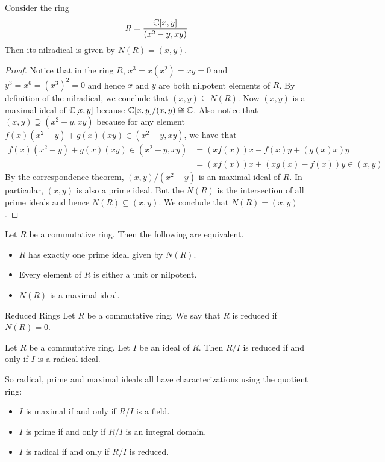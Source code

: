 \documentclass[a4paper]{article}
\begin{document}
\begin{eg}{}{} Consider the ring $$R=\frac{\mathbb{C}[x,y]}{(x^2-y,xy)}$$ Then its nilradical is given by $N(R)=(x,y)$. \tcbline
\begin{proof}
Notice that in the ring $R$, $x^3=x(x^2)=xy=0$ and $y^3=x^6=(x^3)^2=0$ and hence $x$ and $y$ are both nilpotent elements of $R$. By definition of the nilradical, we conclude that $(x,y)\subseteq N(R)$. Now $(x,y)$ is a maximal ideal of $\mathbb{C}[x,y]$ because $\mathbb{C}[x,y]/(x,y)\cong\mathbb{C}$. Also notice that $(x,y)\supseteq(x^2-y,xy)$ because for any element $f(x)(x^2-y)+g(x)(xy)\in(x^2-y,xy)$, we have that 
\begin{align*}
f(x)(x^2-y)+g(x)(xy)\in(x^2-y,xy)&=(xf(x))x-f(x)y+(g(x)x)y\\
&=(xf(x))x+(xg(x)-f(x))y\in (x,y)
\end{align*}
By the correspondence theorem, $(x,y)/(x^2-y)$ is an maximal ideal of $R$. In particular, $(x,y)$ is also a prime ideal. But the $N(R)$ is the intersection of all prime ideals and hence $N(R)\subseteq(x,y)$. We conclude that $N(R)=(x,y)$. 
\end{proof}
\end{eg}

\begin{prp}{}{} Let $R$ be a commutative ring. Then the following are equivalent. 
\begin{itemize}
\item $R$ has exactly one prime ideal given by $N(R)$. 
\item Every element of $R$ is either a unit or nilpotent. 
\item $N(R)$ is a maximal ideal. 
\end{itemize}
\end{prp}

\begin{defn}{Reduced Rings}{} Let $R$ be a commutative ring. We say that $R$ is reduced if $N(R)=0$. 
\end{defn}

\begin{prp}{}{} Let $R$ be a commutative ring. Let $I$ be an ideal of $R$. Then $R/I$ is reduced if and only if $I$ is a radical ideal. 
\end{prp}

So radical, prime and maximal ideals all have characterizations using the quotient ring: 
\begin{itemize}
\item $I$ is maximal if and only if $R/I$ is a field. 
\item $I$ is prime if and only if $R/I$ is an integral domain. 
\item $I$ is radical if and only if $R/I$ is reduced. 
\end{itemize}
\end{document}
